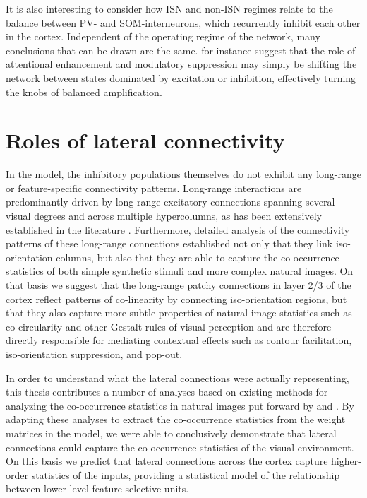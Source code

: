 It is also interesting to consider how ISN and non-ISN regimes relate
to the balance between PV- and SOM-interneurons, which recurrently
inhibit each other in the cortex. Independent of the operating regime
of the network, many conclusions that can be drawn are the
same. \cite{Rubin2015} for instance suggest that the role of
attentional enhancement and modulatory suppression may simply be
shifting the network between states dominated by excitation or
inhibition, effectively turning the knobs of balanced amplification.

\section{Roles of lateral connectivity}

In the model, the inhibitory populations themselves do not exhibit any
long-range or feature-specific connectivity patterns. Long-range
interactions are predominantly driven by long-range excitatory
connections spanning several visual degrees and across multiple
hypercolumns, as has been extensively established in the literature
\citep{Weliky1995, Bair2003}. Furthermore, detailed analysis of the
connectivity patterns of these long-range connections established not
only that they link iso-orientation columns, but also that they are
able to capture the co-occurrence statistics of both simple synthetic
stimuli and more complex natural images. On that basis we suggest that
the long-range patchy connections in layer 2/3 of the cortex reflect
patterns of co-linearity by connecting iso-orientation regions, but
that they also capture more subtle properties of natural image
statistics such as co-circularity and other Gestalt rules of visual
perception and are therefore directly responsible for mediating
contextual effects such as contour facilitation, iso-orientation
suppression, and pop-out.

In order to understand what the lateral connections were actually
representing, this thesis contributes a number of analyses based on
existing methods for analyzing the co-occurrence statistics in natural
images put forward by \cite{Geisler2001} and \cite{Perrinet2015}. By
adapting these analyses to extract the co-occurrence statistics from
the weight matrices in the model, we were able to conclusively
demonstrate that lateral connections could capture the co-occurrence
statistics of the visual environment. On this basis we predict that
lateral connections across the cortex capture higher-order statistics
of the inputs, providing a statistical model of the relationship
between lower level feature-selective units.

